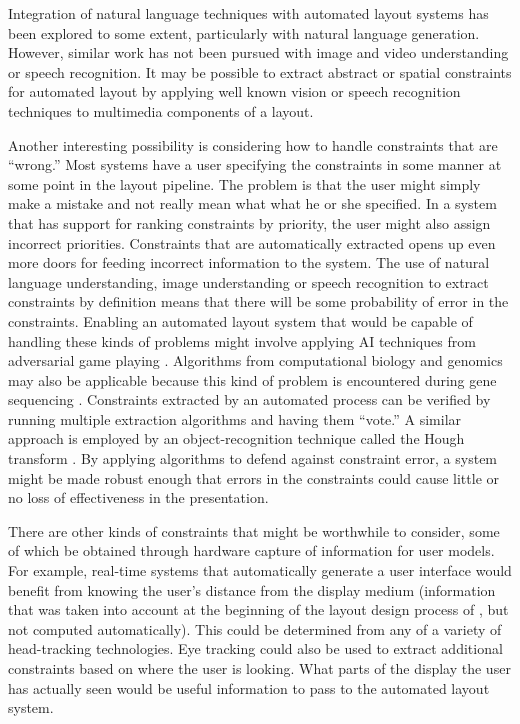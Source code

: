     Integration of natural language techniques with automated layout systems
    has been explored to some extent, particularly with natural language
    generation. However, similar work has not been pursued with image and video
    understanding or speech recognition. It may be possible to extract abstract
    or spatial constraints for automated layout by applying well known vision
    or speech recognition techniques to multimedia components of a layout.

    Another interesting possibility is considering how to handle constraints
    that are “wrong.” Most systems have a user specifying the constraints in
    some manner at some point in the layout pipeline. The problem is that the
    user might simply make a mistake and not really mean what what he or she
    specified. In a system that has support for ranking constraints by
    priority, the user might also assign incorrect priorities. Constraints that
    are automatically extracted opens up even more doors for feeding incorrect
    information to the system. The use of natural language understanding, image
    understanding or speech recognition to extract constraints by definition
    means that there will be some probability of error in the constraints.
    Enabling an automated layout system that would be capable of handling these
    kinds of problems might involve applying AI techniques from adversarial
    game playing \citep{nilsson-1}. Algorithms from computational biology and
    genomics may also be applicable because this kind of problem is encountered
    during gene sequencing \citep{salzberg-1}. Constraints extracted by an
    automated process can be verified by running multiple extraction algorithms
    and having them “vote.” A similar approach is employed by an
    object-recognition technique called the Hough transform \citep{horn-1}. By
    applying algorithms to defend against constraint error, a system might be
    made robust enough that errors in the constraints could cause little or no
    loss of effectiveness in the presentation.

    There are other kinds of constraints that might be worthwhile to consider,
    some of which be obtained through hardware capture of information for user
    models. For example, real-time systems that automatically generate a user
    interface would benefit from knowing the user’s distance from the display
    medium (information that was taken into account at the beginning of the
    layout design process of \citep{feiner-1}, but not computed automatically).
    This could be determined from any of a variety of head-tracking
    technologies. Eye tracking could also be used to extract additional
    constraints based on where the user is looking. What parts of the display
    the user has actually seen would be useful information to pass to the
    automated layout system.

